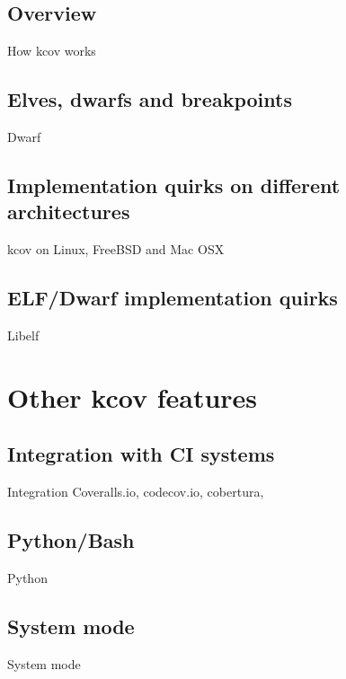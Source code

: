 \documentclass{beamer}
\begin{document}
\subsection{Overview}
\begin{frame}{How kcov works}
\end{frame}

\subsection{Elves, dwarfs and breakpoints}
\begin{frame}{Dwarf}
\end{frame}

\subsection{Implementation quirks on different architectures}
\begin{frame}{kcov on Linux, FreeBSD and Mac OSX}
\end{frame}

\subsection{ELF/Dwarf implementation quirks}
\begin{frame}{Libelf}
\end{frame}

\section{Other kcov features}

\subsection{Integration with CI systems}
\begin{frame}{Integration}
  Coveralls.io, codecov.io, cobertura, 
\end{frame}

\subsection{Python/Bash}
\begin{frame}{Python}
\end{frame}

\subsection{System mode}
\begin{frame}{System mode}
\end{frame}
\end{document}
